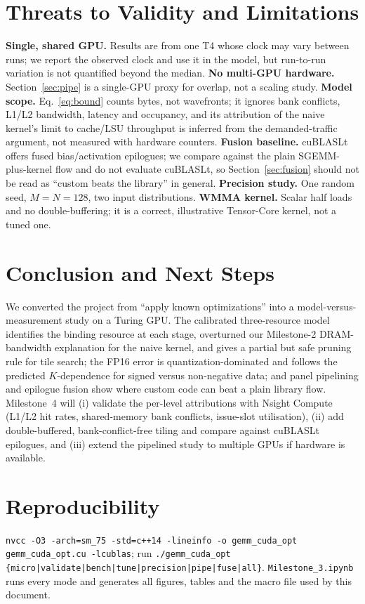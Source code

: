 \documentclass[conference]{IEEEtran}
\begin{document}
\section{Threats to Validity and Limitations}\label{sec:threats}
\textbf{Single, shared GPU.} Results are from one T4 whose clock may vary between runs; we report the observed clock and use it in the model, but run-to-run variation is not quantified beyond the median. \textbf{No multi-GPU hardware.} Section~\ref{sec:pipe} is a single-GPU proxy for overlap, not a scaling study. \textbf{Model scope.} Eq.~\eqref{eq:bound} counts bytes, not wavefronts; it ignores bank conflicts, L1/L2 bandwidth, latency and occupancy, and its attribution of the naive kernel's limit to cache/LSU throughput is inferred from the demanded-traffic argument, not measured with hardware counters. \textbf{Fusion baseline.} cuBLASLt offers fused bias/activation epilogues; we compare against the plain SGEMM-plus-kernel flow and do not evaluate cuBLASLt, so Section~\ref{sec:fusion} should not be read as ``custom beats the library'' in general. \textbf{Precision study.} One random seed, $M{=}N{=}128$, two input distributions. \textbf{WMMA kernel.} Scalar half loads and no double-buffering; it is a correct, illustrative Tensor-Core kernel, not a tuned one.

\section{Conclusion and Next Steps}
We converted the project from ``apply known optimizations'' into a model-versus-measurement study on a Turing GPU. The calibrated three-resource model identifies the binding resource at each stage, overturned our Milestone-2 DRAM-bandwidth explanation for the naive kernel, and gives a partial but safe pruning rule for tile search; the FP16 error is quantization-dominated and follows the predicted $K$-dependence for signed versus non-negative data; and panel pipelining and epilogue fusion show where custom code can beat a plain library flow. Milestone~4 will (i) validate the per-level attributions with Nsight Compute (L1/L2 hit rates, shared-memory bank conflicts, issue-slot utilisation), (ii) add double-buffered, bank-conflict-free tiling and compare against cuBLASLt epilogues, and (iii) extend the pipelined study to multiple GPUs if hardware is available.

\section*{Reproducibility}
\texttt{nvcc -O3 -arch=sm\_75 -std=c++14 -lineinfo -o gemm\_cuda\_opt gemm\_cuda\_opt.cu -lcublas}; run \texttt{./gemm\_cuda\_opt \{micro|validate|bench|tune|precision|pipe|fuse|all\}}. \texttt{Milestone\_3.ipynb} runs every mode and generates all figures, tables and the macro file used by this document.
\end{document}
